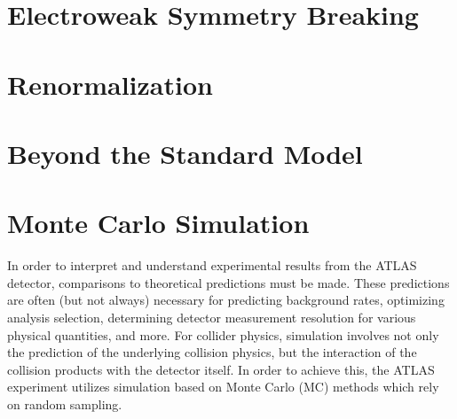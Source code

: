 % 
\section{Electroweak Symmetry Breaking}
\section{Renormalization}
\section{Beyond the Standard Model}

\section{Monte Carlo Simulation}
\label{sec:monte_carlo}
In order to interpret and understand experimental results from the ATLAS detector, comparisons to theoretical predictions must be made.
These predictions are often (but not always) necessary for predicting background rates, optimizing analysis selection, determining detector measurement resolution for various physical quantities, and more.
For collider physics, simulation involves not only the prediction of the underlying collision physics, but the interaction of the collision products with the detector itself.
In order to achieve this, the ATLAS experiment utilizes simulation based on Monte Carlo (MC) methods which rely on random sampling.

